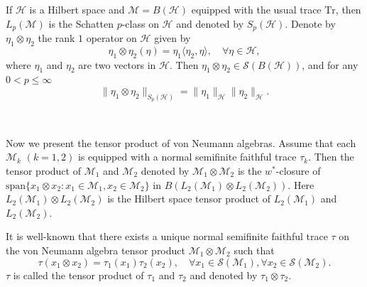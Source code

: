 \documentclass[oneside,english,a4wide]{amsart}
\numberwithin{equation}{section}
\numberwithin{figure}{section}
\theoremstyle{plain}
\theoremstyle{plain}
\theoremstyle{definition}
\theoremstyle{plain}
\theoremstyle{remark}
\theoremstyle{definition}
\theoremstyle{remark}
\theoremstyle{definition}
\newcommand{\M}{{\mathcal M}}
\newcommand{\8}{\infty}
\newcommand{\la}{\langle}
\newcommand{\ra}{\rangle}
\begin{document}
If $\mathcal{H}$ is a Hilbert space and $\mathcal{M}=B(\mathcal{H})$ equipped with the usual trace $\mathrm{Tr}$, then $L_p(\mathcal{M})$ is the Schatten $p$-class on $\mathcal{H}$ and denoted by  $S_p(\mathcal{H})$. Denote by $\eta_1\otimes\eta_2$ the rank $1$ operator on $\mathcal{H}$ given by
\[\eta_1\otimes\eta_2(\eta)= \eta_1\la \eta_2, \eta\ra, \quad \forall\eta\in\mathcal{H},\]
where $\eta_1$ and $\eta_2$ are two vectors in $\mathcal{H}$.
Then $\eta_1\otimes\eta_2\in \mathcal{S}(B(\mathcal{H}))$, and for any $0<p\leq\8$
$$  \|\eta_1\otimes\eta_2\|_{S_p(\mathcal{H})}=\|\eta_1\|_\mathcal{H}\|\eta_2\|_\mathcal{H}.  $$


\

Now we present the tensor product of von Neumann algebras. Assume that each $\mathcal{M}_k$ $(k=1, 2)$ is equipped with a normal semifinite faithful trace $\tau_k$. Then the tensor product of $\M_1$ and $\M_2$ denoted by $\mathcal{M}_1 \otimes \mathcal{M}_2$ is the $w^*$-closure of $\text{span}\{x_1\otimes x_2: x_1\in \M_1, x_2\in \M_2\}$ in $B(L_2(\M_1)\otimes L_2(\M_2))$. Here $L_2(\M_1)\otimes L_2(\M_2)$ is the Hilbert space tensor product of $L_2(\M_1)$ and $ L_2(\M_2)$.

It is well-known that there exists a unique normal semifinite faithful trace $\tau$ on the von Neumann algebra tensor product $\mathcal{M}_1 \otimes \mathcal{M}_2$ such that
$$
\tau\left(x_1 \otimes x_2\right)=\tau_1\left(x_1\right) \tau_2\left(x_2\right), \quad \forall x_1 \in \mathcal{S}(\M_1), \forall x_2 \in \mathcal{S}(\M_2) .
$$
$\tau$ is called the tensor product of $\tau_1$ and $\tau_2$ and denoted by $\tau_1 \otimes \tau_2$. 
\end{document}
